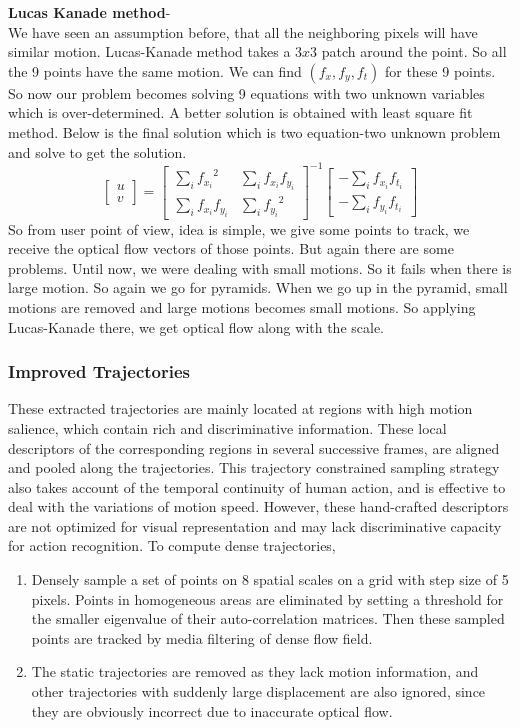 \textbf{Lucas Kanade method}-\\
We have seen an assumption before, that all the neighboring pixels will have similar motion. Lucas-Kanade method takes a $3x3$ patch around the point. So all the 9 points have the same motion. We can find $(f_x, f_y, f_t)$ for these 9 points. So now our problem becomes solving 9 equations with two unknown variables which is over-determined. A better solution is obtained with least square fit method. Below is the final solution which is two equation-two unknown problem and solve to get the solution.
\begin{equation}
\begin{bmatrix} u \\ v \end{bmatrix} =
\begin{bmatrix}
    \sum_{i}{f_{x_i}}^2  &  \sum_{i}{f_{x_i} f_{y_i} } \\
    \sum_{i}{f_{x_i} f_{y_i}} & \sum_{i}{f_{y_i}}^2
\end{bmatrix}^{-1}
\begin{bmatrix}
    - \sum_{i}{f_{x_i} f_{t_i}} \\
    - \sum_{i}{f_{y_i} f_{t_i}}
\end{bmatrix}
\end{equation}
So from user point of view, idea is simple, we give some points to track, we receive the optical flow vectors of those points. But again there are some problems. Until now, we were dealing with small motions. So it fails when there is large motion. So again we go for pyramids. When we go up in the pyramid, small motions are removed and large motions becomes small motions. So applying Lucas-Kanade there, we get optical flow along with the scale.

\subsubsection{Improved Trajectories}
These extracted trajectories are mainly located at regions with high motion salience, which contain rich and discriminative information. These local descriptors of the corresponding regions in several successive frames, are aligned and pooled along the trajectories. This trajectory constrained sampling strategy also takes account of the temporal continuity of human action, and is effective to deal with the variations of motion speed. However, these hand-crafted descriptors are not optimized for visual representation and may lack discriminative capacity for action recognition. To compute dense trajectories, 
\begin{enumerate}
\item  Densely sample a set of points on 8 spatial scales on a grid with step size of 5 pixels. Points in homogeneous areas are eliminated by setting a threshold for the smaller eigenvalue of their auto-correlation matrices. Then these sampled points
are tracked by media filtering of dense flow field.
\item The static trajectories are removed as they lack motion information, and other trajectories with suddenly large displacement are also ignored, since they are obviously incorrect due to inaccurate optical flow.
\end{enumerate}


